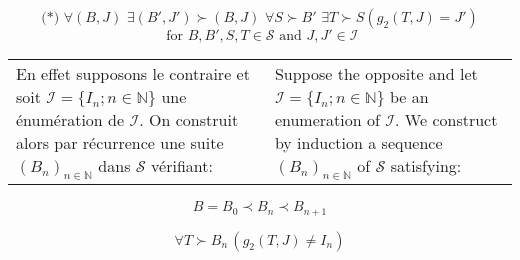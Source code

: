 \documentclass[12pt]{article}
\theoremstyle{plain}
\theoremstyle{definition}
\theoremstyle{remark}
\begin{document}
\[\text{(*) }\forall (B,J) \,\,\exists (B',J')\succ(B,J) \,\,\forall S \succ B' \,\,\exists T \succ S (g_2(T,J)=J')\]\[ \text{ for } B,B',S,T\in\mathcal{S} \text{ and } J,J'\in\mathcal{I}\]

\begin{tabular}{p{2.8in} p{2.8in}}

En effet supposons le contraire et soit $\mathcal{I}=\{I_n ; n\in\mathbb{N}\}$ une \'enum\'eration de $\mathcal{I}$. On construit alors par r\'ecurrence une suite $(B_n)_{n\in\mathbb{N}}$ dans $\mathcal{S}$ v\'erifiant:

&

Suppose the opposite and let $\mathcal{I}=\{I_n ; n\in\mathbb{N}\}$ be an enumeration of $\mathcal{I}$. We construct by induction a sequence $(B_n)_{n\in\mathbb{N}}$ of $\mathcal{S}$ satisfying:

\end{tabular}

\setcounter{equation}{0}
\begin{equation}
B = B_0 \prec B_n \prec B_{n+1}
\end{equation}

\begin{equation}
\forall T \succ B_n \, (g_2(T,J)\not= I_n)
\end{equation}
\end{document}
